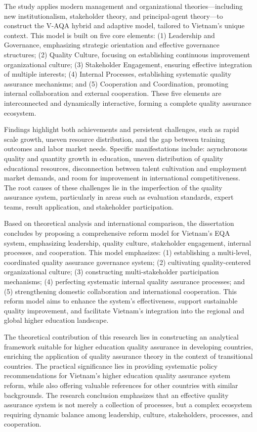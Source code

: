 \begin{eabstract}
The study applies modern management and organizational theories—including new institutionalism, stakeholder theory, and principal-agent theory—to construct the V-AQA hybrid and adaptive model, tailored to Vietnam's unique context. This model is built on five core elements: (1) Leadership and Governance, emphasizing strategic orientation and effective governance structures; (2) Quality Culture, focusing on establishing continuous improvement organizational culture; (3) Stakeholder Engagement, ensuring effective integration of multiple interests; (4) Internal Processes, establishing systematic quality assurance mechanisms; and (5) Cooperation and Coordination, promoting internal collaboration and external cooperation. These five elements are interconnected and dynamically interactive, forming a complete quality assurance ecosystem.

Findings highlight both achievements and persistent challenges, such as rapid scale growth, uneven resource distribution, and the gap between training outcomes and labor market needs. Specific manifestations include: asynchronous quality and quantity growth in education, uneven distribution of quality educational resources, disconnection between talent cultivation and employment market demands, and room for improvement in international competitiveness. The root causes of these challenges lie in the imperfection of the quality assurance system, particularly in areas such as evaluation standards, expert teams, result application, and stakeholder participation.

Based on theoretical analysis and international comparison, the dissertation concludes by proposing a comprehensive reform model for Vietnam's EQA system, emphasizing leadership, quality culture, stakeholder engagement, internal processes, and cooperation. This model emphasizes: (1) establishing a multi-level, coordinated quality assurance governance system; (2) cultivating quality-centered organizational culture; (3) constructing multi-stakeholder participation mechanisms; (4) perfecting systematic internal quality assurance processes; and (5) strengthening domestic collaboration and international cooperation. This reform model aims to enhance the system's effectiveness, support sustainable quality improvement, and facilitate Vietnam's integration into the regional and global higher education landscape.

The theoretical contribution of this research lies in constructing an analytical framework suitable for higher education quality assurance in developing countries, enriching the application of quality assurance theory in the context of transitional countries. The practical significance lies in providing systematic policy recommendations for Vietnam's higher education quality assurance system reform, while also offering valuable references for other countries with similar backgrounds. The research conclusion emphasizes that an effective quality assurance system is not merely a collection of processes, but a complex ecosystem requiring dynamic balance among leadership, culture, stakeholders, processes, and cooperation.
\end{eabstract}


